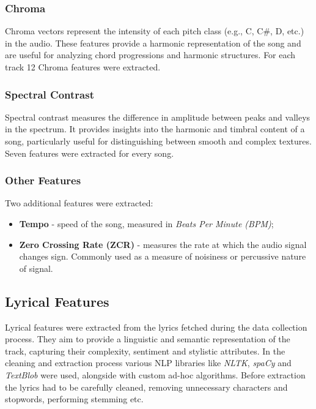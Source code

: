 \subsubsection*{Chroma}
Chroma vectors represent the intensity of each pitch class (e.g., C, C#, D,
etc.) in the audio. These features provide a harmonic representation of the
song and are useful for analyzing chord progressions and harmonic structures.
For each track 12 Chroma features were extracted.

\subsubsection*{Spectral Contrast}
Spectral contrast measures the difference in amplitude between peaks and
valleys in the spectrum. It provides insights into the harmonic and timbral
content of a song, particularly useful for distinguishing between smooth and
complex textures. Seven features were extracted for every song.

\subsubsection*{Other Features}
Two additional features were extracted:
\begin{itemize}
  \item \textbf{Tempo} - speed of the song, measured in
    \textit{Beats Per Minute (BPM)};
  \item \textbf{Zero Crossing Rate (ZCR)} - measures the rate at which the audio
    signal changes sign. Commonly used as a measure of noisiness or
    percussive nature of signal.
\end{itemize}


\subsection{Lyrical Features}
\label{sec:lyricalfeatures}

Lyrical features  were extracted from the lyrics fetched during the data
collection process. They aim to provide a linguistic and semantic
representation of the track, capturing their complexity, sentiment and
stylistic  attributes. In the cleaning and extraction  process various NLP
libraries like \textit{NLTK}, \textit{spaCy} and \textit{TextBlob} were used,
alongside with custom ad-hoc algorithms. Before extraction the lyrics  had to
be carefully cleaned, removing unnecessary characters and stopwords, performing
stemming etc. \cite{nltk,spacy,textblob} 

